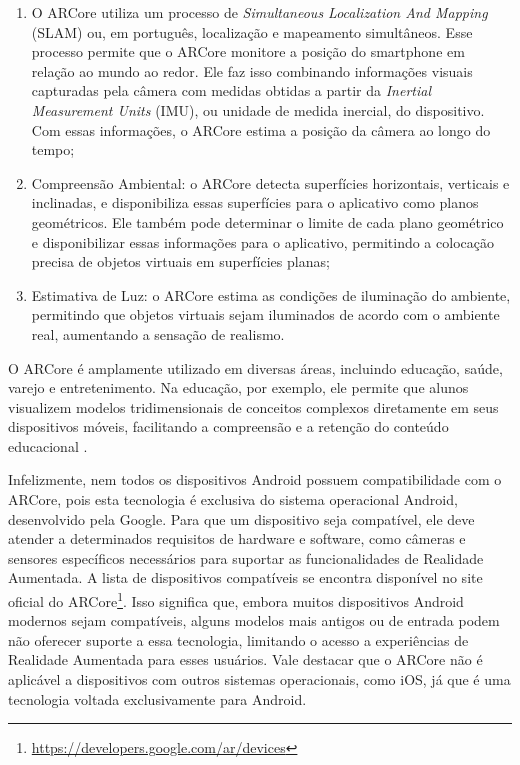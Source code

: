 \documentclass[12pt]{article}
\begin{document}
\begin{enumerate}
    \item O ARCore utiliza um processo de \textit{Simultaneous Localization And Mapping} (SLAM) ou, em português, localização e mapeamento simultâneos.
    Esse processo permite que o ARCore monitore a posição do smartphone em relação ao mundo ao redor.
    Ele faz isso combinando informações visuais capturadas pela câmera com medidas obtidas a partir da \textit{Inertial Measurement Units} (IMU), ou unidade de medida inercial, do dispositivo.
    Com essas informações, o ARCore estima a posição da câmera ao longo do tempo;
    \item Compreensão Ambiental: o ARCore detecta superfícies horizontais, verticais e inclinadas, e disponibiliza essas superfícies para o aplicativo como planos geométricos. Ele também pode determinar o limite de cada plano geométrico e disponibilizar essas informações para o aplicativo, permitindo a colocação precisa de objetos virtuais em superfícies planas;
    \item Estimativa de Luz: o ARCore estima as condições de iluminação do ambiente, permitindo que objetos virtuais sejam iluminados de acordo com o ambiente real, aumentando a sensação de realismo.
\end{enumerate}

O ARCore é amplamente utilizado em diversas áreas, incluindo educação, saúde, varejo e entretenimento. Na educação, por exemplo, ele permite que alunos visualizem modelos tridimensionais de conceitos complexos diretamente em seus dispositivos móveis, facilitando a compreensão e a retenção do conteúdo educacional \cite{cavalcante2024explorando}.

Infelizmente, nem todos os dispositivos Android possuem compatibilidade com o ARCore, pois esta tecnologia é exclusiva do sistema operacional Android, desenvolvido pela Google. Para que um dispositivo seja compatível, ele deve atender a determinados requisitos de hardware e software, como câmeras e sensores específicos necessários para suportar as funcionalidades de Realidade Aumentada.
A lista de dispositivos compatíveis se encontra disponível no site oficial do ARCore\footnote{\href{https://developers.google.com/ar/devices}{https://developers.google.com/ar/devices}}. Isso significa que, embora muitos dispositivos Android modernos sejam compatíveis, alguns modelos mais antigos ou de entrada podem não oferecer suporte a essa tecnologia, limitando o acesso a experiências de Realidade Aumentada para esses usuários. Vale destacar que o ARCore não é aplicável a dispositivos com outros sistemas operacionais, como iOS, já que é uma tecnologia voltada exclusivamente para Android. 
\end{document}
